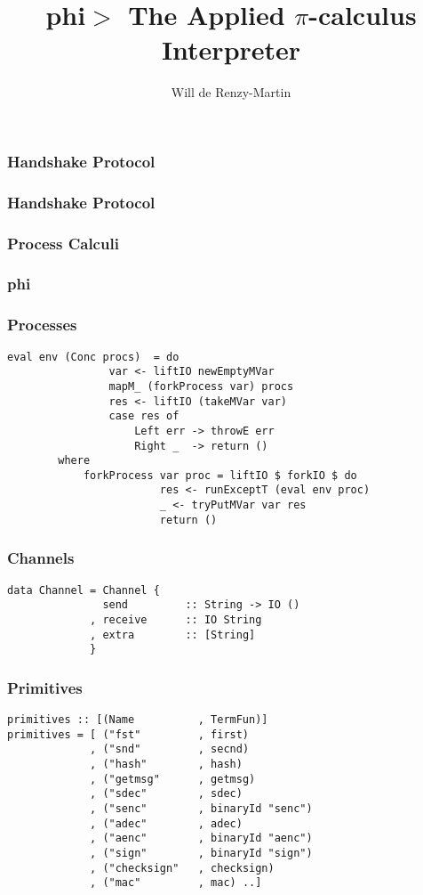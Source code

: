 \documentclass[t]{beamer}
\author{Will de Renzy-Martin}
\title{phi$>$ The Applied $\pi$-calculus Interpreter}
\begin{document}
\frame{\maketitle}

\begin{frame}
\frametitle{Handshake Protocol}
\end{frame}

\begin{frame}
\frametitle{Handshake Protocol}
\end{frame}

\begin{frame}
\frametitle{Process Calculi}
\end{frame}

\begin{frame}
\frametitle{phi}
\end{frame}

\begin{frame}[fragile]
\frametitle{Processes}
\begin{verbatim}
eval env (Conc procs)  = do
                var <- liftIO newEmptyMVar 
                mapM_ (forkProcess var) procs
                res <- liftIO (takeMVar var)
                case res of
                    Left err -> throwE err
                    Right _  -> return ()
        where
            forkProcess var proc = liftIO $ forkIO $ do
                        res <- runExceptT (eval env proc)
                        _ <- tryPutMVar var res
                        return ()
\end{verbatim}
\end{frame}

\begin{frame}[fragile]
\frametitle{Channels}
\begin{verbatim}
data Channel = Channel {
               send         :: String -> IO ()
             , receive      :: IO String
             , extra        :: [String]
             }
\end{verbatim}

\end{frame}


\begin{frame}[fragile]
\frametitle{Primitives}
\begin{verbatim}
primitives :: [(Name          , TermFun)]
primitives = [ ("fst"         , first)
             , ("snd"         , secnd)
             , ("hash"        , hash)
             , ("getmsg"      , getmsg)
             , ("sdec"        , sdec)
             , ("senc"        , binaryId "senc")
             , ("adec"        , adec)
             , ("aenc"        , binaryId "aenc")
             , ("sign"        , binaryId "sign")
             , ("checksign"   , checksign)
             , ("mac"         , mac) ..]
\end{verbatim}
\end{frame}
\end{document}
